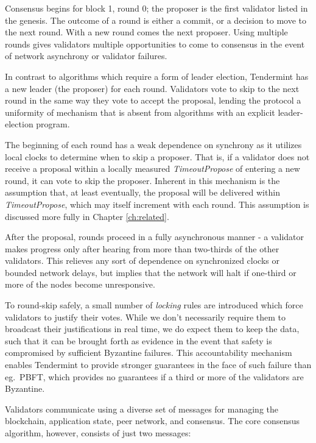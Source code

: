 Consensus begins for block 1, round 0; the proposer is the first validator listed in the genesis.
The outcome of a round is either a commit, or a decision to move to the next round.
With a new round comes the next proposer.
Using multiple rounds gives validators multiple opportunities to come to consensus in the event of network asynchrony or validator failures.

In contrast to algorithms which require a form of leader election, Tendermint has a new leader (the proposer) for each round.
Validators vote to skip to the next round in the same way they vote to accept the proposal,
lending the protocol a uniformity of mechanism that is absent from algorithms with an explicit leader-election program.

The beginning of each round has a weak dependence on synchrony as it utilizes local clocks to determine when to skip a proposer.
That is, if a validator does not receive a proposal within a locally measured \emph{TimeoutPropose} of entering a new round, it can vote to skip the proposer.
Inherent in this mechanism is the assumption that, at least eventually, the proposal will be delivered within \emph{TimeoutPropose}, which may itself increment with each round.
This assumption is discussed more fully in Chapter \ref{ch:related}.

After the proposal, rounds proceed in a fully asynchronous manner - a validator makes progress only after hearing from more than two-thirds of the other validators.
This relieves any sort of dependence on synchronized clocks or bounded network delays,
but implies that the network will halt if one-third or more of the nodes become unresponsive.

To round-skip safely, a small number of \emph{locking} rules are introduced which force validators to justify their votes.
While we don't necessarily require them to broadcast their justifications in real time, we do expect them to keep the data,
such that it can be brought forth as evidence in the event that safety is compromised by sufficient Byzantine failures.
This accountability mechanism enables Tendermint to provide stronger guarantees in the face of such failure than eg.~PBFT,
which provides no guarantees if a third or more of the validators are Byzantine.

Validators communicate using a diverse set of messages for managing the blockchain, application state, peer network, and consensus.
The core consensus algorithm, however, consists of just two messages:

